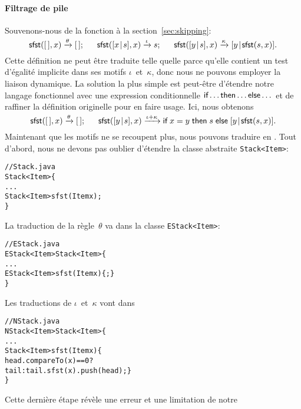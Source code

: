 \paragraph{Filtrage de pile}

Souvenons-nous de la fonction  à la
section~\vref{sec:skipping}:
\begin{equation*}
\textsf{sfst}([\,],x)          \xrightarrow{\smash{\theta}} [\,];\quad\;\;
\textsf{sfst}([{x}\!\mid\!{s}],x)  \xrightarrow{\smash{\iota}}  s;\quad\;\;
\textsf{sfst}([{y}\!\mid\!{s}],x)  \xrightarrow{\smash{\kappa}}
                                         [{y}\!\mid\!{\textsf{sfst}(s,x)}].
\end{equation*}
Cette définition ne peut être traduite telle quelle parce qu'elle
contient un test d'égalité implicite dans ses motifs
\(\iota\)~et~\(\kappa\), donc nous ne pouvons employer la liaison
dynamique. La solution la plus simple est peut-être d'étendre notre
langage fonctionnel avec une expression conditionnelle \(\textsf{if}
\dots \textsf{then} \dots \textsf{else} \dots\) et de raffiner la définition
originelle pour en faire usage. Ici, nous obtenons
\begin{equation*}
\textsf{sfst}([\,],x)          \xrightarrow{\smash{\theta}} [\,];\quad\;\;
\textsf{sfst}([{y}\!\mid\!{s}],x)  \xrightarrow{\smash{\iota+\kappa}}
\textsf{if} \; x = y \; \textsf{then} \; s \;
\textsf{else} \; [{y}\!\mid\!{\textsf{sfst}(s,x)}].
\end{equation*}
Maintenant que les motifs ne se recoupent plus, nous pouvons traduire
en \Java. Tout d'abord, nous ne devons pas oublier d'étendre la classe
abstraite \texttt{Stack<Item>}:
\begin{alltt}
// Stack.java
\public \abstractX \class Stack<Item> \{
  ...
  \public \abstractX Stack<Item> sfst(\final Item x);
\}
\end{alltt}
La traduction de la règle~\(\theta\) va dans la classe
\texttt{EStack<Item>}:
\begin{alltt}
// EStack.java
\public \final \class EStack<Item> \extends Stack<Item> \{
  ...
  \public EStack<Item> sfst(\final Item x) \{ \return \this; \}
\}
\end{alltt}
Les traductions de \(\iota\)~et~\(\kappa\) vont dans
\begin{alltt}
// NStack.java
\public \final \class NStack<Item> \extends Stack<Item> \{
  ...
  \public Stack<Item> sfst(\final Item x) \{
    \return head.compareTo(x) == 0 ?
           tail : tail.sfst(x).push(head); \}
\}
\end{alltt}
Cette dernière étape révèle une erreur et une limitation de notre
